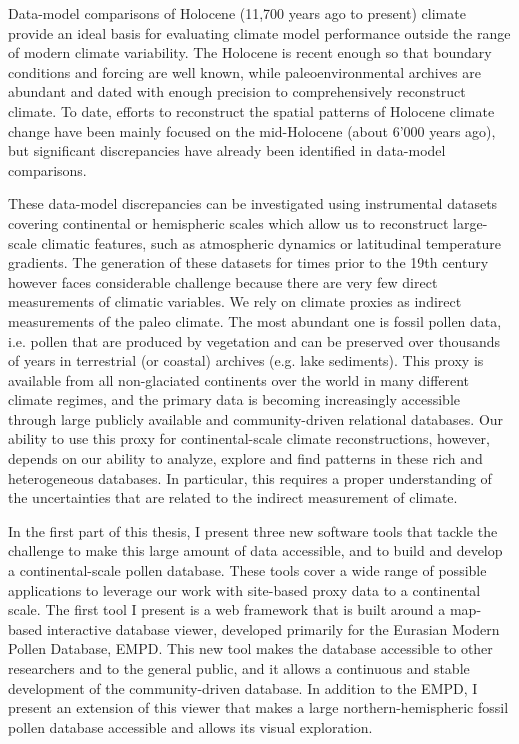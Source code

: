 \begin{thesisabstract}[]
\addchaptertocentry{\abstractname} %
Data-model comparisons of Holocene (11,700 years ago to present) climate provide an ideal basis for evaluating climate model performance outside the range of modern climate variability. The Holocene  is recent enough so that boundary conditions and forcing are well known, while paleoenvironmental archives are abundant and dated with enough precision to comprehensively reconstruct climate. To date, efforts to reconstruct the spatial patterns of Holocene climate change have been mainly focused on the mid-Holocene (about 6'000 years ago), but significant discrepancies have already been identified in data-model comparisons.

These data-model discrepancies can be investigated using instrumental datasets covering continental or hemispheric scales which allow us to reconstruct large-scale climatic features, such as atmospheric dynamics or latitudinal temperature gradients. The generation of these datasets for times prior to the 19th century however faces considerable challenge because there are very few direct measurements of climatic variables. We rely on climate proxies as indirect measurements of the paleo climate. The most abundant one is fossil pollen data, i.e. pollen that are produced by vegetation and can be preserved over thousands of years in terrestrial (or coastal) archives (e.g. lake sediments). This proxy is available from all non-glaciated continents over the world in many different climate regimes, and the primary data is becoming increasingly accessible through large publicly available and community-driven relational databases. Our ability to use this proxy for continental-scale climate reconstructions, however, depends on our ability to analyze, explore and find patterns in these rich and heterogeneous databases. In particular, this requires a proper understanding of the uncertainties that are related to the indirect measurement of climate.

In the first part of this thesis, I present three new software tools that tackle the challenge to make this large amount of data accessible, and to build and develop a continental-scale pollen database. These tools cover a wide range of possible applications to leverage our work with site-based proxy data to a continental scale.
The first tool I present is a web framework that is built around a map-based interactive database viewer, developed primarily for the Eurasian Modern Pollen Database, EMPD. This new tool makes the database accessible to other researchers and to the general public, and it allows a continuous and stable development of the community-driven database. In addition to the EMPD, I present an extension of this viewer that makes a large northern-hemispheric fossil pollen database accessible and allows its visual exploration.


\end{thesisabstract}
